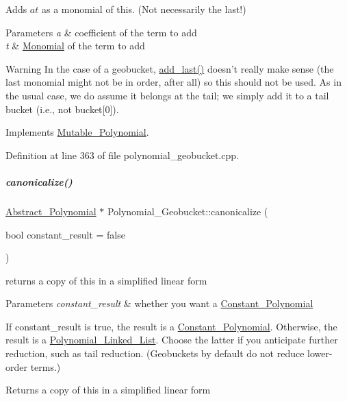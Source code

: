 Adds $at$ as a monomial of {\ttfamily this}. (Not necessarily the last!) 


\begin{DoxyParams}{Parameters}
{\em a} & coefficient of the term to add \\
\hline
{\em t} & \hyperlink{group__polygroup_class_monomial}{Monomial} of the term to add \\
\hline
\end{DoxyParams}
\begin{DoxyWarning}{Warning}
In the case of a geobucket, \hyperlink{group__polygroup_ada4a539d3666cd6801a75c8861bc35fa}{add\+\_\+last()} doesn't really make sense (the last monomial might not be in order, after all) so this should not be used. As in the usual case, we do assume it belongs at the tail; we simply add it to a tail bucket (i.\+e., not {\ttfamily bucket\mbox{[}0\mbox{]}}). 
\end{DoxyWarning}


Implements \hyperlink{group__polygroup_a966bd6c897acf04ac697bc0a4ca46a89}{Mutable\+\_\+\+Polynomial}.



Definition at line 363 of file polynomial\+\_\+geobucket.\+cpp.

\mbox{\label{group__polygroup_aa76d2c0dce16690b01e8a8c4862b11c5}} 
\subparagraph{\texorpdfstring{canonicalize()}{canonicalize()}}
{\footnotesize\ttfamily \hyperlink{group__polygroup_class_abstract___polynomial}{Abstract\+\_\+\+Polynomial} $\ast$ Polynomial\+\_\+\+Geobucket\+::canonicalize (\begin{DoxyParamCaption}\item[{bool}]{constant\+\_\+result = {\ttfamily false} }\end{DoxyParamCaption})}



returns a copy of {\ttfamily this} in a simplified linear form 


\begin{DoxyParams}{Parameters}
{\em constant\+\_\+result} & whether you want a \hyperlink{group__polygroup_class_constant___polynomial}{Constant\+\_\+\+Polynomial}\\
\hline
\end{DoxyParams}
If {\ttfamily constant\+\_\+result} is {\ttfamily true}, the result is a {\ttfamily \hyperlink{group__polygroup_class_constant___polynomial}{Constant\+\_\+\+Polynomial}}. Otherwise, the result is a {\ttfamily \hyperlink{group__polygroup_class_polynomial___linked___list}{Polynomial\+\_\+\+Linked\+\_\+\+List}}. Choose the latter if you anticipate further reduction, such as tail reduction. (Geobuckets by default do not reduce lower-\/order terms.) \begin{DoxyReturn}{Returns}
a copy of {\ttfamily this} in a simplified linear form 
\end{DoxyReturn}


